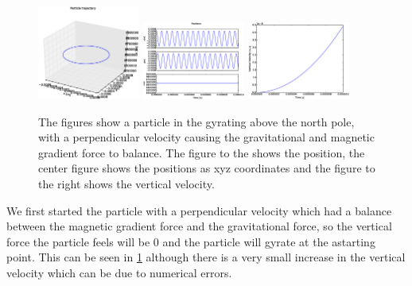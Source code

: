 \documentclass[x11names]{article}
\begin{document}
  \begin{figure}
      \centering
      \includegraphics[width = 0.30\textwidth]{figures/7_0_12_3Dplot}
      \includegraphics[width = 0.30\textwidth]{figures/7_0_12_xyz}
      \includegraphics[width = 0.30\textwidth]{figures/7_0_12_vertical_vel}
      \caption{ The figures show a particle in the gyrating above the north pole, with a perpendicular velocity causing the gravitational and magnetic gradient force to balance. The figure to the shows the position, the center figure shows the positions as xyz coordinates and the figure to the right shows the vertical velocity.}
      \label{fig:no_perturbation}
    \end{figure}

  We first started the particle with a perpendicular velocity which had a balance between the magnetic gradient force and the gravitational force, so the vertical force the particle feels will be \(0\) and the particle will gyrate at the astarting point. This can be seen in \cref{fig:no_perturbation} although there is a very small increase in the vertical velocity which can be due to numerical errors.
\end{document}
